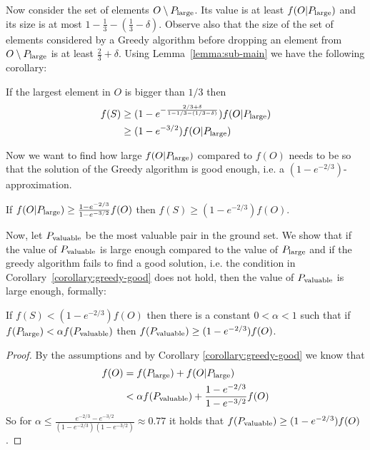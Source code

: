 Now consider the set of elements $O \setminus P_{\text{large}}$.
Its value is at least $f(O|P_{\text{large}})$ and its size is at most $1 - \frac{1}{3} - (\frac{1}{3} - \delta)$.
Observe also that the size of the set of elements considered by a Greedy algorithm before dropping an element from $O \setminus P_{\text{large}}$ is at least $\frac{2}{3} + \delta$.
Using Lemma~\ref{lemma:sub-main} we have the following corollary:

\begin{corollary}
	\label{eq:sub:greedy}
	If the largest element in $O$ is bigger than $1/3$ then
	\begin{align*}
		f(S) & \geq (1-e^{-\frac{2/3 + \delta}{1 - 1/3 - (1/3 - \delta)}})f(O|P_{\text{large}})
		\\		& \geq (1 - e^{-3/2})f(O|P_{\text{large}})
	\end{align*}
\end{corollary}

Now we want to find how large $f(O|P_{\text{large}})$ compared to $f(O)$ needs to be so that the solution of the Greedy algorithm is good enough, i.e. a $(1-e^{-2/3})$-approximation.

\begin{corollary}
	\label{corollary:greedy-good}
	If $f(O|P_{\text{large}}) \geq \frac{1-e^{-2/3}}{1-e^{-3/2}}f(O)$ then $f(S) \geq (1 - e^{-2/3})f(O)$.
\end{corollary}

Now, let $P_{\text{valuable}}$ be the most valuable pair in the ground set.
We show that if the value of $P_{\text{valuable}}$ is large enough compared to the value of $P_{\text{large}}$ and if the greedy algorithm fails to find a good solution, i.e. the condition in Corollary~\ref{corollary:greedy-good} does not hold, then the value of $P_{\text{valuable}}$ is large enough, formally:

\begin{lemma}
	\label{lemma:sub:alpha}
	If $f(S) < (1 - e^{-2/3})f(O)$ then there is a constant $0 < \alpha < 1$ such that if $f(P_{\text{large}}) < \alpha f(P_{\text{valuable}})$ then $f(P_{\text{valuable}}) \geq (1 - e^{-2/3})f(O)$.
\end{lemma}

\begin{proof}
	By the assumptions and by Corollary \ref{corollary:greedy-good} we know that 
	\begin{align}
		f(O)	& = f(P_{\text{large}}) + f(O|P_{\text{large}}) 
		\\ 		& < \alpha f(P_{\text{valuable}}) + \frac{1-e^{-2/3}}{1-e^{-3/2}}f(O)
	\end{align}
	So for $\alpha \leq \frac{e^{-2/3} - e^{-3/2}}{(1-e^{-2/3})(1-e^{-3/2})} \approx 0.77$ it holds that $f(P_{\text{valuable}}) \geq (1 - e^{-2/3})f(O)$.
\end{proof}

